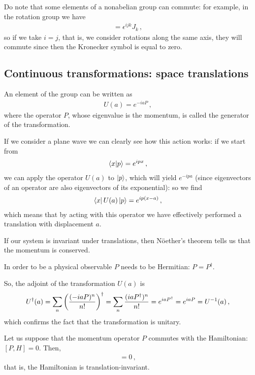 \documentclass[main.tex]{subfiles}
\begin{document}

Do note that some elements of a nonabelian group can commute: for example, in the rotation group we have 
%
\begin{align}
[J^{i}, J^{j}] = \epsilon^{ijk} J_{k}
\,,
\end{align}
%
so if we take \(i = j\), that is, we consider rotations along the same axis, they will commute since then the Kronecker symbol is equal to zero. 

\subsection{Continuous transformations: space translations}

An element of the group can be written as 
%
\begin{align}
U(a) = e^{ - i a P }
\,,
\end{align}
%
where the operator \(P\), whose eigenvalue is the momentum, is called the generator of the transformation. 

If we consider a plane wave we can clearly see how this action works: if we start from
%
\begin{align}
\braket{x}{p} = e^{i p x}
\,,
\end{align}
%
we can apply the operator \(U(a)\) to \(\ket{p}\), which will yield \(e^{-ipa}\) (since eigenvectors of an operator are also eigenvectors of its exponential): so we find
%
\begin{align}
\bra{x} U(a) \ket{p} = e^{i p (x-a)}
\,,
\end{align}
%
which means that by acting with this operator we have effectively performed a translation with displacement \(a\). 

If our system is invariant under translations, then Nöether's theorem tells us that the momentum is conserved. 

In order to be a physical observable \(P\) needs to be Hermitian: \(P = P ^\dag\). 

So, the adjoint of the transformation \(U(a)\) is 
%
\begin{align}
U ^\dag (a) =
\sum _{n} \qty(\frac{(-iaP)^{n}}{n!}) ^\dag
= \sum _{n} \frac{(iaP ^\dag)^{n}}{n!}
=
e^{i a P ^\dag} = e^{iaP} = U^{-1}(a)
\,,
\end{align}
%
which confirms the fact that the transformation is unitary. 

Let us suppose that the momentum operator \(P\) commutes with the Hamiltonian: \([P,H] = 0\). Then, 
%
\begin{align}
[U(a), H] = 0 
\,,
\end{align}
%
that is, the Hamiltonian is translation-invariant. 
\end{document}
